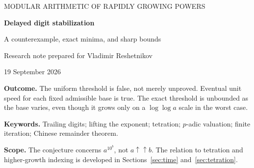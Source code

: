 \documentclass[11pt,a4paper]{article}
\theoremstyle{definition}
\newcommand{\astar}{a_{\star}}
\begin{document}
\begin{center}
{\small\sffamily\color{Olive}MODULAR ARITHMETIC OF RAPIDLY GROWING POWERS}\par\vspace{12pt}
{\LARGE\bfseries Delayed digit stabilization}\par\vspace{6pt}
{\Large A counterexample, exact minima, and sharp bounds}\par\vspace{14pt}
{\normalsize Research note prepared for Vladimir Reshetnikov}\par\vspace{4pt}
{\normalsize 19 September 2026}
\end{center}
\vspace{6pt}
\begin{abstract}
For $a\ge2$ not divisible by $10$, put
$S_a(b)=\nu_{10}(a^{10^{b+1}}-a^{10^b})$ and
$D_a(b)=S_a(b)-S_a(b-1)$. A publicly posed conjecture asks whether
$D_a(b)=1$ always holds for $b\ge3$. We disprove it and prove that the
smallest counterexample is
$\astar=3\cdot2^{99}+1=1901475900342344102245054808065$:
$S_{\astar}(2)=100$ and $S_{\astar}(3)=102$.
The mechanism is competition between an exponentially growing valuation at
one prime and an affine valuation at the other. We give exact formulas for
all bases, determine the first permanently unit increment, construct
arbitrarily delayed examples, and determine the least counterexample at
every prescribed stage. An exact density formula quantifies the scarcity of
exceptions. We then prove an arbitrary-radix local formula, characterize
convergence and finite limit cycles, and explain how fast-growing changes
of index transform the stabilization rate. A separate calculation for genuine
integer tetration makes the distinction between the two iterations explicit.
All mathematical claims are proved in ordinary mathematics; accompanying
standard-library Python code supplies independent modular certificates and
regression tests.
\end{abstract}
\begin{resultbox}
\textbf{Outcome.} The uniform threshold is false, not merely unproved.
Eventual unit speed for each fixed admissible base is true. The exact
threshold is unbounded as the base varies, even though it grows only on a
$\log\log a$ scale in the worst case.
\end{resultbox}
\vspace{4pt}
\noindent\textbf{Keywords.} Trailing digits; lifting the exponent; tetration;
$p$-adic valuation; finite iteration; Chinese remainder theorem.\par
\noindent\textbf{Scope.} The conjecture concerns $a^{10^b}$, not $a\uparrow\uparrow b$.
The relation to tetration and higher-growth indexing is developed in
Sections~\ref{sec:time} and~\ref{sec:tetration}.
\newpage
\begingroup
\setlength{\parskip}{0pt}
\small
\tableofcontents
\endgroup
\newpage
\end{document}
